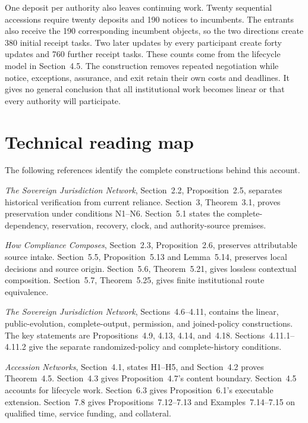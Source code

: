 \documentclass{momentum}
\begin{document}
One deposit per authority also leaves continuing work.
Twenty sequential accessions require twenty deposits and 190 notices to incumbents.
The entrants also receive the 190 corresponding incumbent objects, so the two directions create 380 initial receipt tasks.
Two later updates by every participant create forty updates and 760 further receipt tasks.
These counts come from the lifecycle model in Section~4.5.
The construction removes repeated negotiation while notice, exceptions, assurance, and exit retain their own costs and deadlines.
It gives no general conclusion that all institutional work becomes linear or that every authority will participate.

\section{Technical reading map}
\label{sec:reading}

The following references identify the complete constructions behind this account.

\begin{description}[style=nextline]
\item[Evidence and present use.]
\emph{The Sovereign Jurisdiction Network}, Section~2.2, Proposition~2.5, separates historical verification from current reliance.
Section~3, Theorem~3.1, proves preservation under conditions N1--N6.
Section~5.1 states the complete-dependency, reservation, recovery, clock, and authority-source premises.

\item[Local questions and route histories.]
\emph{How Compliance Composes}, Section~2.3, Proposition~2.6, preserves attributable source intake.
Section~5.5, Proposition~5.13 and Lemma~5.14, preserves local decisions and source origin.
Section~5.6, Theorem~5.21, gives lossless contextual composition.
Section~5.7, Theorem~5.25, gives finite institutional route equivalence.

\item[Observation and policy composition.]
\emph{The Sovereign Jurisdiction Network}, Sections~4.6--4.11, contains the linear, public-evolution, complete-output, permission, and joined-policy constructions.
The key statements are Propositions~4.9, 4.13, 4.14, and~4.18.
Sections~4.11.1--4.11.2 give the separate randomized-policy and complete-history conditions.

\item[Accession and reserved capacity.]
\emph{Accession Networks}, Section~4.1, states H1--H5, and Section~4.2 proves Theorem~4.5.
Section~4.3 gives Proposition~4.7's content boundary.
Section~4.5 accounts for lifecycle work.
Section~6.3 gives Proposition~6.1's executable extension.
Section~7.8 gives Propositions~7.12--7.13 and Examples~7.14--7.15 on qualified time, service funding, and collateral.
\end{description}
\end{document}
